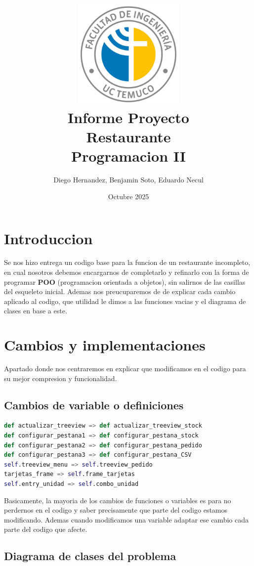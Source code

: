 \documentclass[a4paper,12pt]{article}
\title {\includegraphics[width=0.4\textwidth]{Ing_Uni.jpg}\\[2ex]{\textbf{Informe Proyecto\\ Restaurante}\\[1.5ex] Programacion II\\[20ex]}}
\author{Diego Hernandez, Benjamin Soto, Eduardo Necul}
\date{Octubre 2025}
\begin{document}
\maketitle
\newpage

\section{Introduccion}

Se nos hizo entrega un codigo base para la funcion de un restaurante incompleto, en cual nosotros debemos encargarnos de completarlo y refinarlo con la forma de programar \textbf{POO} (programacion orientada a objetos), sin salirnos de las casillas del esqueleto inicial. Ademas nos preucuparemos de de explicar cada cambio aplicado al codigo, que utilidad le dimos a las funciones vacias y el diagrama de clases en base a este.

\section{Cambios y implementaciones}

Apartado donde nos centraremos en explicar que modificamos en el codigo para su mejor compresion y funcionalidad.

\subsection{Cambios de variable o definiciones}

\begin{lstlisting}[language=Python, caption={Cambios de definiciones o variables}, frame=single]
def actualizar_treeview => def actualizar_treeview_stock
def configurar_pestana1 => def configurar_pestana_stock
def configurar_pestana2 => def configurar_pestana_pedido
def configurar_pestana3 => def configurar_pestana_CSV
self.treeview_menu => self.treeview_pedido
tarjetas_frame => self.frame_tarjetas
self.entry_unidad => self.combo_unidad
\end{lstlisting}

Basicamente, la mayoria de los cambios de funciones o variables es para no perdernos en el codigo y saber precisamente que parte del codigo estamos modificando. Ademas cuando modificamos una variable adaptar ese cambio cada parte del codigo que afecte.


\subsection{Diagrama de clases del problema}
\end{document}
